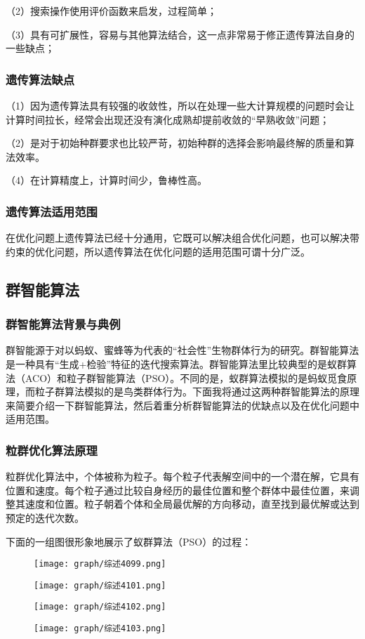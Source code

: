 \documentclass{cjc}
\begin{document}
（2）搜索操作使用评价函数来启发，过程简单；

（3）具有可扩展性，容易与其他算法结合，这一点非常易于修正遗传算法自身的一些缺点；

\subsubsection{遗传算法缺点}
（1）因为遗传算法具有较强的收敛性，所以在处理一些大计算规模的问题时会让计算时间拉长，经常会出现还没有演化成熟却提前收敛的“早熟收敛”问题；

（2）是对于初始种群要求也比较严苛，初始种群的选择会影响最终解的质量和算法效率。

（4）在计算精度上，计算时间少，鲁棒性高。
\subsubsection{遗传算法适用范围}
在优化问题上遗传算法已经十分通用，它既可以解决组合优化问题，也可以解决带约束的优化问题，所以遗传算法在优化问题的适用范围可谓十分广泛。

\subsection{群智能算法}
\subsubsection{群智能算法背景与典例}
群智能源于对以蚂蚁、蜜蜂等为代表的“社会性”生物群体行为的研究。群智能算法是一种具有“生成+检验”特征的迭代搜索算法。群智能算法里比较典型的是蚁群算法（ACO）和粒子群智能算法（PSO）。不同的是，蚁群算法模拟的是蚂蚁觅食原理，而粒子群算法模拟的是鸟类群体行为。下面我将通过这两种群智能算法的原理来简要介绍一下群智能算法，然后着重分析群智能算法的优缺点以及在优化问题中适用范围。

\subsubsection{粒群优化算法原理}
粒群优化算法中，个体被称为粒子。每个粒子代表解空间中的一个潜在解，它具有位置和速度。每个粒子通过比较自身经历的最佳位置和整个群体中最佳位置，来调整其速度和位置。粒子朝着个体和全局最优解的方向移动，直至找到最优解或达到预定的迭代次数。

下面的一组图很形象地展示了蚁群算法（PSO）的过程：

\begin{figure}
  \centering
  \texttt{[image: graph/综述4099.png]}
\end{figure}
\begin{figure}
  \centering
  \texttt{[image: graph/综述4101.png]}
\end{figure}
\begin{figure}
  \centering
  \texttt{[image: graph/综述4102.png]}
\end{figure}
\begin{figure}
  \centering
  \texttt{[image: graph/综述4103.png]}
\end{figure}
\end{document}
